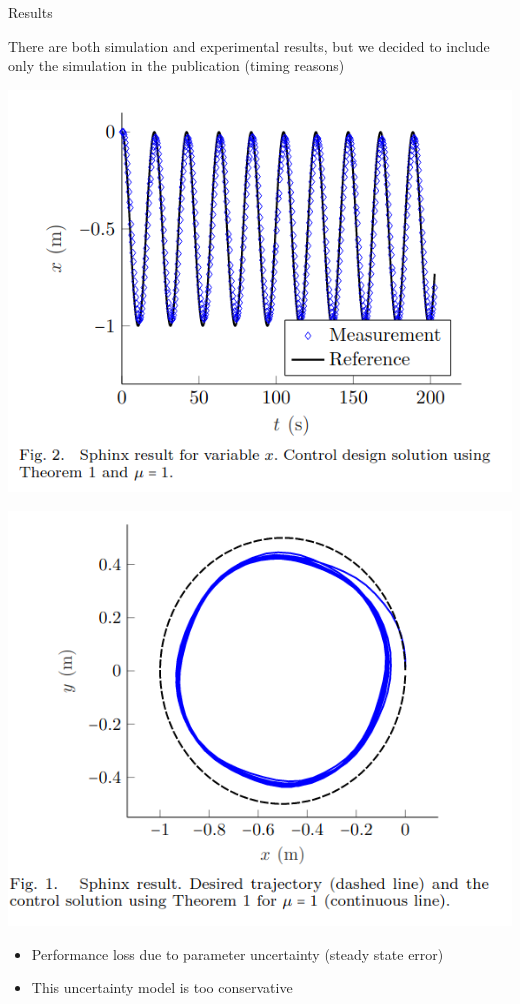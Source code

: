 \begin{frame}{Results}
\begin{block}{}
There are both simulation and experimental results, but we decided to include only the simulation in the publication (timing reasons)
\end{block}
\begin{minipage}{0.45\textwidth}
        \centering
        \includegraphics[scale=0.3]{img/icuas_x.png}
    \end{minipage}\hfill
    \begin{minipage}{0.45\textwidth}
        \centering
        \includegraphics[scale=0.3]{img/icuas_xy.png}
    \end{minipage}
    \begin{itemize}
        \item Performance loss due to parameter uncertainty (steady state error)
        \item This uncertainty model is too conservative
    \end{itemize}
\end{frame}


